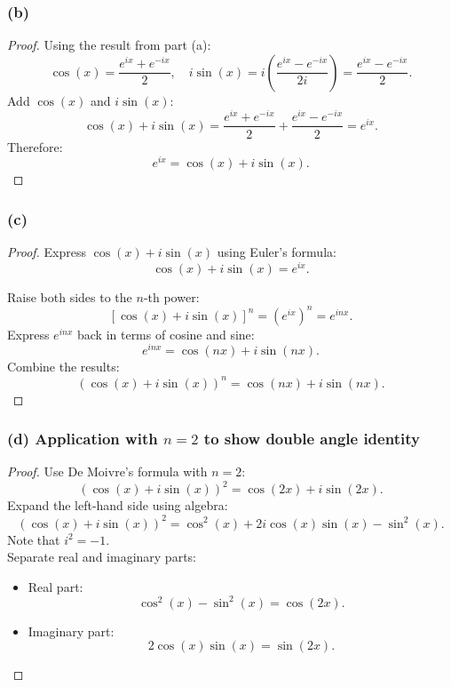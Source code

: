 \documentclass{article}
\begin{document}
\subsubsection*{(b)}
\begin{proof}
    Using the result from part (a):
    \[
        \cos(x) = \frac{e^{ix} + e^{-ix}}{2}, \quad 
        i \sin(x) = i \left( \frac{e^{ix} - e^{-ix}}{2i} \right) = \frac{e^{ix} - e^{-ix}}{2}.
    \]
    Add \( \cos(x) \) and \( i \sin(x) \):
    \[
        \cos(x) + i \sin(x) = \frac{e^{ix} + e^{-ix}}{2} + \frac{e^{ix} - e^{-ix}}{2} = e^{ix}.
    \]
    Therefore:
    \[
        e^{ix} = \cos(x) + i \sin(x).
    \]
\end{proof}

\subsubsection*{(c)}
\begin{proof}
    Express \( \cos(x) + i \sin(x) \) using Euler's formula:
    \[
        \cos(x) + i \sin(x) = e^{ix}.
    \]

    Raise both sides to the \( n \)-th power:
    \[
        [\cos(x) + i \sin(x)]^n = (e^{ix})^n = e^{inx}.
    \]
    Express \( e^{inx} \) back in terms of cosine and sine:
    \[
        e^{inx} = \cos(nx) + i \sin(nx).
    \]
    Combine the results:
    \[
        (\cos(x) + i \sin(x))^n = \cos(nx) + i \sin(nx).
    \]
\end{proof}

\subsubsection*{(d) Application with $n = 2$ to show double angle identity}
\begin{proof}
    Use De Moivre's formula with \( n = 2 \):
    \[
        (\cos(x) + i \sin(x))^2 = \cos(2x) + i \sin(2x).
    \]
    Expand the left-hand side using algebra:
    \[
        (\cos(x) + i \sin(x))^2 = \cos^2(x) + 2i \cos(x) \sin(x) - \sin^2(x).
    \]
    Note that \( i^2 = -1 \). 
    \\
    Separate real and imaginary parts:
    \begin{itemize}
        \item Real part:
        \[
        \cos^2(x) - \sin^2(x) = \cos(2x).
        \]
        \item Imaginary part:
        \[
        2 \cos(x) \sin(x) = \sin(2x).
        \]
    \end{itemize}
\end{proof}
\end{document}
